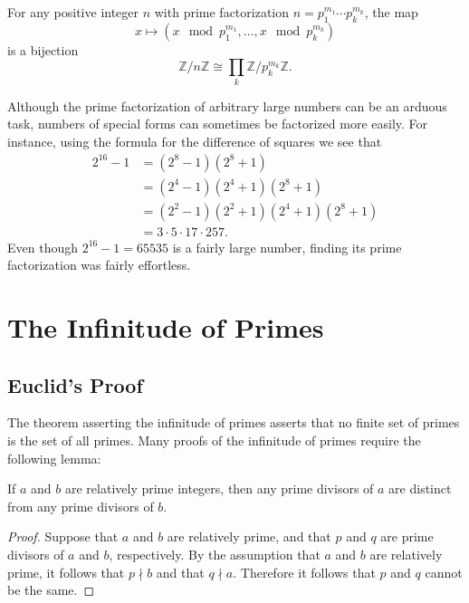 \begin{corollary}
  For any positive integer $n$ with prime factorization $n=p_1^{m_1}\cdots p_k^{m_k}$, the map
  \begin{equation*}
    x\mapsto \left(x\mod{p_1^{m_1}},\ldots,x\mod{p_k^{m_k}}\right)
  \end{equation*}
  is a bijection
  \begin{equation*}
    \mathbb{Z}/n\mathbb{Z} \cong \prod_k \mathbb{Z}/p_k^{m_k}\mathbb{Z}.
  \end{equation*}
\end{corollary}

\begin{remark}
  Although the prime factorization of arbitrary large numbers can be an arduous task, numbers of special forms can sometimes be factorized more easily. For instance, using the formula for the difference of squares we see that
  \begin{align*}
    2^{16}-1 & = (2^8-1)(2^8+1) \\
             & = (2^4-1)(2^4+1)(2^8+1) \\
             & = (2^2-1)(2^2+1)(2^4+1)(2^8+1) \\
             & = 3\cdot 5\cdot 17\cdot 257.
  \end{align*}
  Even though $2^{16}-1=65535$ is a fairly large number, finding its prime factorization was fairly effortless.
\end{remark}

\section{The Infinitude of Primes}

\subsection{Euclid's Proof}

The theorem asserting the infinitude of primes asserts that no finite set of primes is the set of all primes. Many proofs of the infinitude of primes require the following lemma:

\begin{lemma}
  If $a$ and $b$ are relatively prime integers, then any prime divisors of $a$ are distinct from any prime divisors of $b$.
\end{lemma}

\begin{proof}
  Suppose that $a$ and $b$ are relatively prime, and that $p$ and $q$ are prime divisors of $a$ and $b$, respectively. By the assumption that $a$ and $b$ are relatively prime, it follows that $p\nmid b$ and that $q\nmid a$. Therefore it follows that $p$ and $q$ cannot be the same.
\end{proof}

